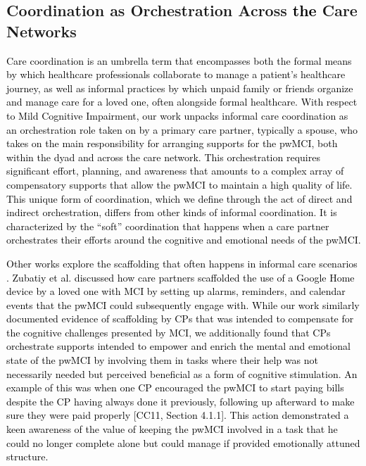 \documentclass[acmsmall]{acmart}
\begin{document}
\subsection{Coordination as Orchestration Across \textcolor{black}{the} Care Networks}

\textcolor{black}{Care coordination is an umbrella term that encompasses both the formal means by which healthcare professionals collaborate to manage a patient's healthcare journey, as well as informal practices by which unpaid family or friends organize and manage care for a loved one, often alongside formal healthcare. With respect to Mild Cognitive Impairment, our work unpacks informal care coordination as an orchestration role taken on by a primary care partner, typically a spouse,  who takes on the main responsibility for arranging supports for the pwMCI, both within the dyad and across the care network. This orchestration requires significant effort, planning, and awareness that amounts to a complex array of compensatory supports that allow the pwMCI to maintain a high quality of life. This unique form of coordination, which we define through the act of direct and indirect orchestration, differs from other kinds of informal coordination. It is characterized by the “soft” coordination that happens when a care partner orchestrates their efforts around the cognitive and emotional needs of the pwMCI.}

\textcolor{black}{Other works explore the scaffolding that often happens in informal care scenarios \cite{schurgin2021isolation, zubatiy2021empowering, bhat2023we}. Zubatiy et al\textcolor{black}{.} discussed how care partners scaffolded the use of a Google Home device by a loved \textcolor{black}{one} with MCI by setting up alarms, reminders, and calendar events that the pwMCI could subsequently \textcolor{black}{engage with}. While our work similarly documented evidence of scaffolding by CP\textcolor{black}{s that was} intended to compensate for the cognitive challenges presented by MCI, we  additionally found that CPs orchestrate supports intended to empower and enrich the mental and emotional state of the pwMCI \textcolor{black}{by involving them} in tasks where their help was not necessarily needed but perceived beneficial as a form of cognitive stimulation\textcolor{black}{. An example of this was} when one CP \textcolor{black}{encouraged the pwMCI to start paying bills despite the CP having always done it previously, following up afterward to make sure they were paid properly [CC11, Section 4.1.1]}. This action demonstrated a keen awareness of the value of keeping the pwMCI involved in a task that he could no longer complete  alone but could manage if provided emotionally attuned structure.}
\end{document}
